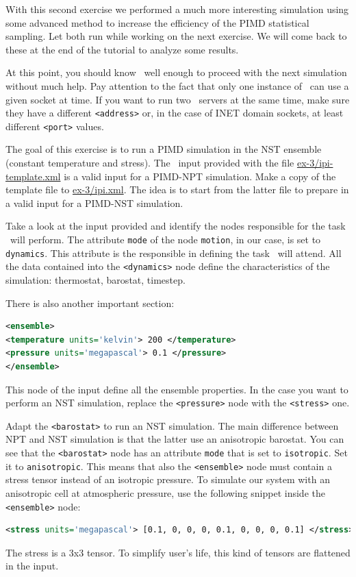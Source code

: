 \documentclass{article}
\begin{document}
With this second exercise we performed a much more interesting
simulation using some advanced method to increase the efficiency of
the PIMD statistical sampling. Let both run while
working on the next exercise. We will come back to these at the end of
the tutorial to analyze some results.

At this point, you should know \ipi\ well enough to
proceed with the next simulation without much help. Pay attention to
the fact that only one instance of \ipi\ can use a given socket at
time. If you want to run two \ipi\ servers at the same time, make sure
they have a different \texttt{<address>} or, in the case of INET domain
sockets, at least different \texttt{<port>} values. 

\vspace{2em}

\begin{Exercise}[label={inputs},title={PIMD-NPT simulation of ice}]
  The goal of this exercise is to run a PIMD simulation in the NST
  ensemble (constant temperature and stress). The \ipi\ input provided
  with the file \url{ex-3/ipi-template.xml} is a valid input for a
  PIMD-NPT simulation. Make a copy of the template file to
  \url{ex-3/ipi.xml}. The idea is to start from the latter file to
  prepare in a valid input for a PIMD-NST simulation.

\Question 
Take a look at the input provided and identify the nodes
responsible for the task \ipi\ will perform.  The attribute
\texttt{mode} of the node \texttt{motion}, in our case, is set to
\texttt{dynamics}. This attribute is the responsible in defining the
task \ipi\ will attend. All the data contained into the
\texttt{<dynamics>} node define the characteristics of the simulation:
thermostat, barostat, timestep. 

There is also another important section:
\begin{lstlisting}[language=xml]
<ensemble>
<temperature units='kelvin'> 200 </temperature>
<pressure units='megapascal'> 0.1 </pressure>
</ensemble>
\end{lstlisting}
This node of the input define all the ensemble properties. In the
case you want to perform an NST simulation, replace the
\texttt{<pressure>} node with the \texttt{<stress>} one. 

\Question 
Adapt the \texttt{<barostat>} to run an NST simulation. The
main difference between NPT and NST simulation is that the latter use
an anisotropic barostat. You can see that the \texttt{<barostat>} node
has an attribute \texttt{mode} that is set to \texttt{isotropic}. Set
it to \texttt{anisotropic}.  This means that also the
\texttt{<ensemble>} node must contain a stress tensor instead of an
isotropic pressure. To simulate our system with an anisotropic cell at
atmospheric pressure, use the following snippet inside the
\texttt{<ensemble>} node:
\begin{lstlisting}[language=xml]
<stress units='megapascal'> [0.1, 0, 0, 0, 0.1, 0, 0, 0, 0.1] </stress>
\end{lstlisting}
The stress is a 3x3 tensor. To simplify user's life, this kind of tensors are
flattened in the \ipi{} input.


\end{Exercise}
\end{document}

